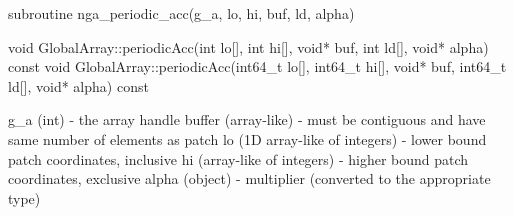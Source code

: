 \documentclass[12pt]{article}
\begin{document}
\begin{fapi}
\begin{fcode}
subroutine nga_periodic_acc(g_a, lo, hi, buf, ld, alpha)
\end{fcode}
\begin{funcargs}
\end{funcargs}
\end{fapi}

\begin{cxxapi}
\begin{cxxcode}
void GlobalArray::periodicAcc(int lo[], int hi[], void* buf,
                              int ld[], void* alpha) const
void GlobalArray::periodicAcc(int64_t lo[], int64_t hi[], void* buf,
                              int64_t ld[], void* alpha) const
\end{cxxcode}
\begin{funcargs}
\end{funcargs}
\end{cxxapi}

\begin{pyapi}
\begin{pycode}
   g_a (int)                      - the array handle
   buffer (array-like)            - must be contiguous and have same 
                                    number of elements as patch
   lo (1D array-like of integers) - lower bound patch coordinates, inclusive
   hi (array-like of integers)    - higher bound patch coordinates, exclusive
   alpha (object)                 - multiplier (converted to the
                                    appropriate type)
\end{pycode}
\end{pyapi}
\end{document}
